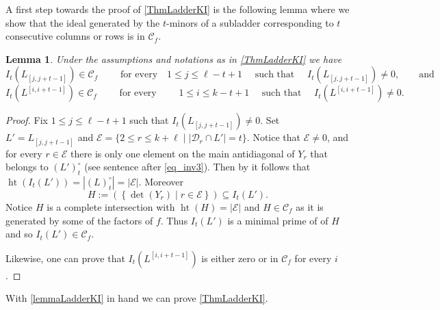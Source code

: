 \documentclass[12pt]{amsart}
\renewcommand{\leq}{\leqslant}
\newtheorem{lemma}[lemma]{Lemma}
\theoremstyle{definition}
\renewcommand{\(}{\left(}
\renewcommand{\)}{\right)}
\newcommand{\Ht}{\operatorname{ht}}
\renewcommand{\!}[1]{{\color{red}\text{\Huge$\star$ }#1}}
\newcommand{\ls}{\leqslant}%
\begin{document}
 A first step towards the proof of  \autoref{ThmLadderKI} is the following lemma where we show that the ideal generated by the $t$-minors of a subladder corresponding to $t$ consecutive columns or rows is in $\mathcal{C}_f$.
\begin{lemma}\label{lemmaLadderKI}
Under the assumptions and notations as  in  \autoref{ThmLadderKI} we have
$$
 I_t\left(L_{[j,j+t-1]}\right) \in \mathcal{C}_f \qquad  \text{ for every } \,\,\,\, 1\ls j\ls  \ell-t+1 \quad \text{ such that } \quad I_t\left(L_{[j,j+t-1]}\right)\neq 0,\qquad \text{and}
 $$
 $$
 I_t\left(L^{[i,i+t-1]}\right) \in \mathcal{C}_f \qquad\text{ for every } \qquad 1\ls i\ls k-t+1 \quad \text{ such that } \quad I_t\left(L^{[i,i+t-1]}\right)\neq 0.
 $$
\end{lemma}

\begin{proof}
Fix $1\ls j\ls \ell-t+1$ such that $I_t\left(L_{[j,j+t-1]}\right)\neq 0$. Set $L'=L_{[j,j+t-1]}$ and  $\mathcal{E}=\{2 \leq r \leq k+\ell \mid \left|\mathcal{D}_{r}\cap L'\right|=t \}$. %
Notice that $\mathcal{E} \neq 0$, and for every $r \in \mathcal{E}$ there is only  one element on the main antidiagonal of $Y_{r}$ that belongs to $(L')^\circ_t$ (see sentence after \autoref{eq_inv3}). Then by  \cite[Theorem 1.15]{GorlaMixed} it follows that $\Ht \left(I_t(L')\right)=|(L)^\circ_t| = | \mathcal{E}|$. Moreover
\begin{equation*}\label{eq_dets_in}
	H:=\left( \left\{\det(Y_{r}) \mid r \in \mathcal{E}\right\}\right)\subseteq I_t(L')  . 
\end{equation*}
Notice $H$ is a complete intersection with $\Ht (H)=|\mathcal{E}|$ and $H\in \mathcal{C}_f$ as it is generated by some of the factors of $f$. Thus $I_t(L')$ is a minimal prime of  of $H$ and so $I_t(L')\in \mathcal{C}_f$. 

Likewise, one can prove that $I_t\left(L^{[i,i+t-1]}\right)$ is either zero or in $ \mathcal{C}_f$ for every $i$.
\end{proof}

With \autoref{lemmaLadderKI} in hand we can  prove  \autoref{ThmLadderKI}.
\end{document}
